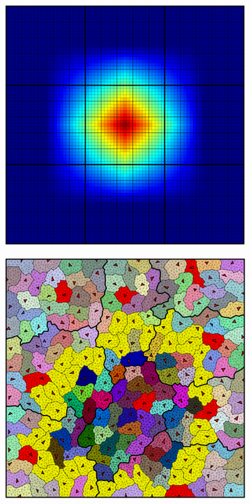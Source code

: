 \begin{figure}[htbp]
\begin{subfigure}[t]{0.3\textwidth}
  \end{subfigure}
  \hfill
  \begin{subfigure}[t]{0.3\textwidth}
    \centerline{\includegraphics[width=0.9\linewidth]{figs/square/square_cart_struct_cell_ml_lvl2_basis.png}}
  \end{subfigure}
  \par\bigskip
  \begin{subfigure}[t]{0.3\textwidth}
    \centerline{\includegraphics[width=0.9\linewidth]{figs/square/square_tria_metis_cell_ml_lvl1_grid.png}}

\end{subfigure}
\end{figure}
